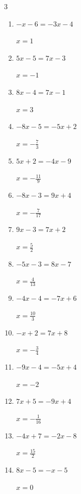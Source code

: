 \begin{multicols}{3}
\begin{enumerate}
        $\displaystyle x=\frac{14}{5}$

  \item $-x-6=-3x-4$

        $\displaystyle x=1$

  \item $5x-5=7x-3$

        $\displaystyle x=-1$

  \item $8x-4=7x-1$

        $\displaystyle x=3$

  \item $-8x-5=-5x+2$

        $\displaystyle x=-\frac{7}{3}$

  \item $5x+2=-4x-9$

        $\displaystyle x=-\frac{11}{9}$

  \item $-8x-3=9x+4$

        $\displaystyle x=-\frac{7}{17}$

  \item $9x-3=7x+2$

        $\displaystyle x=\frac{5}{2}$

  \item $-5x-3=8x-7$

        $\displaystyle x=\frac{4}{13}$

  \item $-4x-4=-7x+6$

        $\displaystyle x=\frac{10}{3}$

  \item $-x+2=7x+8$

        $\displaystyle x=-\frac{3}{4}$

  \item $-9x-4=-5x+4$

        $\displaystyle x=-2$

  \item $7x+5=-9x+4$

        $\displaystyle x=-\frac{1}{16}$

  \item $-4x+7=-2x-8$

        $\displaystyle x=\frac{15}{2}$

  \item $8x-5=-x-5$

        $\displaystyle x=0$

\columnbreak %


\end{enumerate}
\end{multicols}
